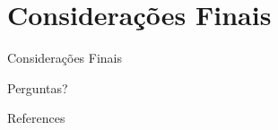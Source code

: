 \documentclass[10pt]{beamer}
\begin{document}
\section{Considerações Finais}

\begin{frame}{Considerações Finais}
    
\end{frame}

{
\begin{frame}[standout]
  Perguntas?
\end{frame}
}

\appendix


\begin{frame}[allowframebreaks]{References}

  
  

\end{frame}
\end{document}

